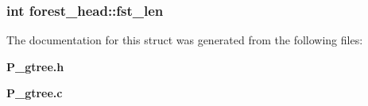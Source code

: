 \subsubsection{\setlength{\rightskip}{0pt plus 5cm}int forest\_\-head::fst\_\-len}\label{structforest__head_m0}




The documentation for this struct was generated from the following files:\begin{CompactItemize}
\item 
{\bf P\_\-gtree.h}\item 
{\bf P\_\-gtree.c}\end{CompactItemize}
